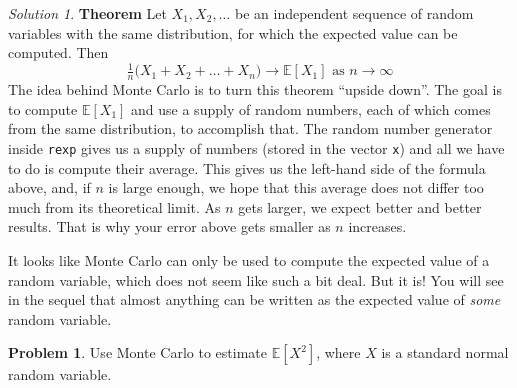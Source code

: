 \documentclass[
]{book}
\theoremstyle{definition}
\theoremstyle{definition}
\theoremstyle{definition}
\newtheorem{exercise}{Problem}[chapter]
\theoremstyle{definition}
\theoremstyle{remark}
\newtheorem*{solution}{Solution}
\begin{document}
\begin{solution}
\textbf{Theorem} Let \(X_1,X_2, \dots\) be an independent sequence of random
variables with the same distribution, for which the expected value can be
computed. Then
\[ \tfrac{1}{n} \Big( X_1+X_2+\dots+X_n\Big) \to {\mathbb{E}}[X_1] \text{ as } n\to\infty\]
The idea behind Monte Carlo is to turn this theorem ``upside down''. The goal is
to compute \({\mathbb{E}}[X_1]\) and use a supply of random numbers, each of which
comes from the same distribution, to accomplish that. The random number
generator inside \texttt{rexp} gives us a supply of numbers (stored in the vector \texttt{x})
and all we have to do is compute their average. This gives us the left-hand side
of the formula above, and, if \(n\) is large enough, we hope that this average
does not differ too much from its theoretical limit. As \(n\) gets larger, we
expect better and better results. That is why your error above gets smaller as
\(n\) increases.

It looks like Monte Carlo can only be used to compute the expected value of a
random variable, which does not seem like such a bit deal. But it is! You will see
in the sequel that almost anything can be written as the expected value of
\emph{some} random variable.
\end{solution}

\begin{exercise}
Use Monte Carlo to estimate \({\mathbb{E}}[X^2]\), where \(X\) is a standard normal
random variable.
\end{exercise}
\end{document}
